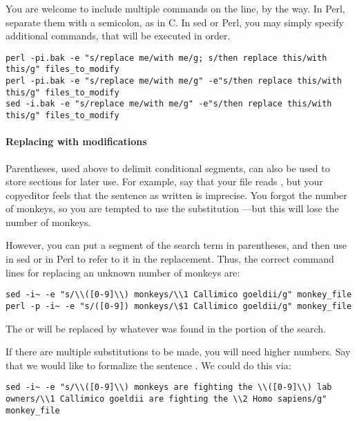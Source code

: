 
You are welcome to include multiple commands on the line, by the way.
In Perl, separate them with a semicolon, as in C. In sed or Perl, you
may simply specify additional  commands, that will be executed in
order.
\begin{lstlisting}
perl -pi.bak -e "s/replace me/with me/g; s/then replace this/with this/g" files_to_modify
perl -pi.bak -e "s/replace me/with me/g" -e"s/then replace this/with this/g" files_to_modify
sed -i.bak -e "s/replace me/with me/g" -e"s/then replace this/with this/g" files_to_modify
\end{lstlisting}

\paragraph{Replacing with modifications} Parentheses, used above to
delimit conditional segments, can also be used to store sections for
later use. For example, say that your file reads , but your copyeditor feels that the sentence as written is
imprecise. You forgot the number of monkeys, so you are tempted to use
the substitution ---but this will
lose the number of monkeys.

However, you can put a segment of the search term in parentheses, and
then use  in sed or  in Perl to refer to it in the replacement. Thus, the
correct command lines for replacing an unknown number of monkeys are:
\begin{lstlisting}
sed -i~ -e "s/\\([0-9]\\) monkeys/\\1 Callimico goeldii/g" monkey_file
perl -p -i~ -e "s/([0-9]) monkeys/\$1 Callimico goeldii/g" monkey_file
\end{lstlisting}
The  or  will be replaced by whatever was found in the
\ci{([0-9])} portion of the search.

If there are multiple substitutions to be made, you will need higher
numbers. Say that we would like to formalize the sentence . We could do this via:
\begin{lstlisting}
sed -i~ -e "s/\\([0-9]\\) monkeys are fighting the \\([0-9]\\) lab owners/\\1 Callimico goeldii are fighting the \\2 Homo sapiens/g" monkey_file
\end{lstlisting}

